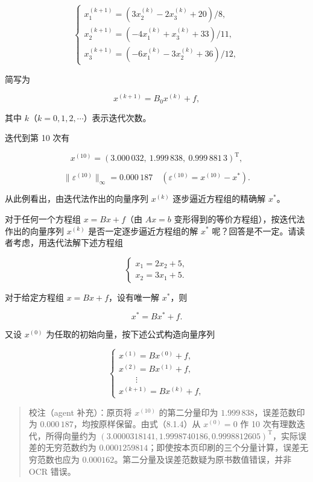 \documentclass[
  10pt,
  fontset=fandol]{ctexart}
\begin{document}
\[
\begin{cases}
x_1^{(k+1)}=(3x_2^{(k)}-2x_3^{(k)}+20)/8,\\
x_2^{(k+1)}=(-4x_1^{(k)}+x_3^{(k)}+33)/11,\\
x_3^{(k+1)}=(-6x_1^{(k)}-3x_2^{(k)}+36)/12,
\end{cases}
\tag{8.1.4}
\]

简写为

\[
x^{(k+1)}=B_0x^{(k)}+f,
\]

其中 \(k\)（\(k=0,1,2,\cdots\)）表示迭代次数。

迭代到第 10 次有

\[
x^{(10)}=(3.000\,032,\ 1.999\,838,\ 0.999\,881\,3)^{\mathrm T},
\]

\[
\|\varepsilon^{(10)}\|_\infty=0.000\,187\quad(\varepsilon^{(10)}=x^{(10)}-x^*).
\]

从此例看出，由迭代法作出的向量序列 \(x^{(k)}\) 逐步逼近方程组的精确解 \(x^*\)。

对于任何一个方程组 \(x=Bx+f\)（由 \(Ax=b\) 变形得到的等价方程组），按迭代法作出的向量序列 \(x^{(k)}\) 是否一定逐步逼近方程组的解 \(x^*\) 呢？回答是不一定。请读者考虑，用迭代法解下述方程组

\[
\begin{cases}
x_1=2x_2+5,\\
x_2=3x_1+5.
\end{cases}
\]

对于给定方程组 \(x=Bx+f\)，设有唯一解 \(x^*\)，则

\[
x^*=Bx^*+f.
\tag{8.1.5}
\]

又设 \(x^{(0)}\) 为任取的初始向量，按下述公式构造向量序列

\[
\begin{cases}
x^{(1)}=Bx^{(0)}+f,\\
x^{(2)}=Bx^{(1)}+f,\\
\qquad\vdots\\
x^{(k+1)}=Bx^{(k)}+f,
\end{cases}
\tag{8.1.6}
\]

\begin{quote}
校注（agent 补充）：原页将 \(x^{(10)}\) 的第二分量印为 \(1.999\,838\)，误差范数印为 \(0.000\,187\)，均按原样保留。由式（8.1.4）从 \(x^{(0)}=0\) 作 10 次有理数迭代，所得向量约为 \((3.0000318141,1.9998740186,0.9998812605)^{\mathrm T}\)，实际误差的无穷范数约为 \(0.0001259814\)；即使按本页印刷的三个分量计算，误差无穷范数也应为 \(0.000162\)。第二分量及误差范数疑为原书数值错误，并非 OCR 错误。
\end{quote}
\end{document}
